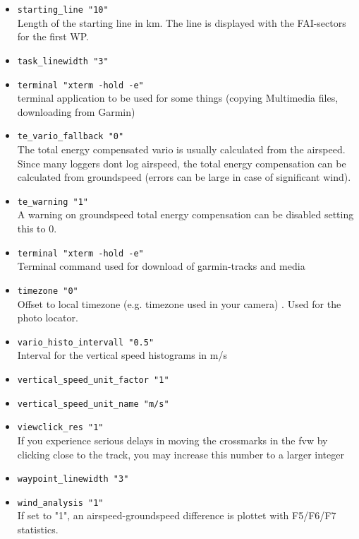 \begin{itemize}
\item \texttt{starting\_line    "10"}\\
  Length of the starting line in km. The line is displayed with the FAI-sectors for the first WP.


\item \texttt{task\_linewidth    "3"}
\item \texttt{terminal    "xterm -hold -e"} \\
	terminal application to be used for some things (copying Multimedia files, downloading from Garmin)

\item \texttt{te\_vario\_fallback "0"}\\
The total energy compensated vario is usually calculated from the airspeed. Since many loggers dont log airspeed,
the total energy compensation can be calculated from groundspeed (errors can be large in case of significant wind).

\item \texttt{te\_warning    "1"}\\
A warning on groundspeed total energy compensation can be disabled setting this to 0.

\item \texttt{terminal	"xterm -hold -e"}\\
Terminal command used for download of garmin-tracks and media

\item \texttt{timezone    "0"}\\
Offset to local timezone (e.g. timezone used in your camera) . Used for the photo locator.

\item \texttt{vario\_histo\_intervall    "0.5"}\\
    Interval for the vertical speed histograms in m/s
\item \texttt{vertical\_speed\_unit\_factor    "1"}
\item \texttt{vertical\_speed\_unit\_name    "m/s"}

\item \texttt{viewclick\_res "1"}\\
	If you experience serious delays in moving the crossmarks in the fvw by clicking close to the track, you may increase this number to a larger integer

\item \texttt{waypoint\_linewidth    "3"}
\item \texttt{wind\_analysis "1"} \\
If set to "1", an airspeed-groundspeed difference is plottet with F5/F6/F7 statistics.


\end{itemize}
